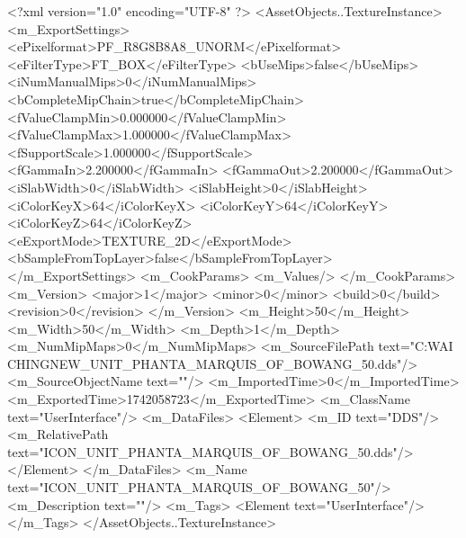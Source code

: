 <?xml version="1.0" encoding="UTF-8" ?>
<AssetObjects..TextureInstance>
	<m_ExportSettings>
		<ePixelformat>PF_R8G8B8A8_UNORM</ePixelformat>
		<eFilterType>FT_BOX</eFilterType>
		<bUseMips>false</bUseMips>
		<iNumManualMips>0</iNumManualMips>
		<bCompleteMipChain>true</bCompleteMipChain>
		<fValueClampMin>0.000000</fValueClampMin>
		<fValueClampMax>1.000000</fValueClampMax>
		<fSupportScale>1.000000</fSupportScale>
		<fGammaIn>2.200000</fGammaIn>
		<fGammaOut>2.200000</fGammaOut>
		<iSlabWidth>0</iSlabWidth>
		<iSlabHeight>0</iSlabHeight>
		<iColorKeyX>64</iColorKeyX>
		<iColorKeyY>64</iColorKeyY>
		<iColorKeyZ>64</iColorKeyZ>
		<eExportMode>TEXTURE_2D</eExportMode>
		<bSampleFromTopLayer>false</bSampleFromTopLayer>
	</m_ExportSettings>
	<m_CookParams>
		<m_Values/>
	</m_CookParams>
	<m_Version>
		<major>1</major>
		<minor>0</minor>
		<build>0</build>
		<revision>0</revision>
	</m_Version>
	<m_Height>50</m_Height>
	<m_Width>50</m_Width>
	<m_Depth>1</m_Depth>
	<m_NumMipMaps>0</m_NumMipMaps>
	<m_SourceFilePath text="C:\Users\YANG WAI CHING\Downloads\CIV\DDS NEW\ICON_UNIT_PHANTA_MARQUIS_OF_BOWANG_50.dds"/>
	<m_SourceObjectName text=""/>
	<m_ImportedTime>0</m_ImportedTime>
	<m_ExportedTime>1742058723</m_ExportedTime>
	<m_ClassName text="UserInterface"/>
	<m_DataFiles>
		<Element>
			<m_ID text="DDS"/>
			<m_RelativePath text="ICON_UNIT_PHANTA_MARQUIS_OF_BOWANG_50.dds"/>
		</Element>
	</m_DataFiles>
	<m_Name text="ICON_UNIT_PHANTA_MARQUIS_OF_BOWANG_50"/>
	<m_Description text=""/>
	<m_Tags>
		<Element text="UserInterface"/>
	</m_Tags>
</AssetObjects..TextureInstance>

